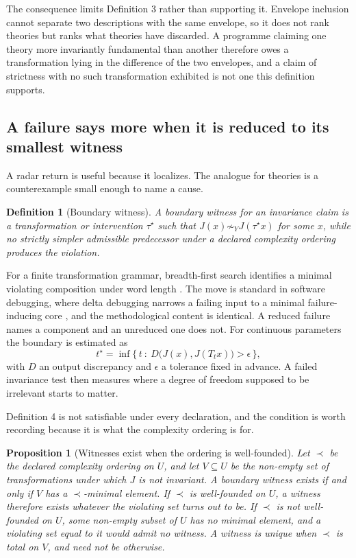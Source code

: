 \documentclass[11pt]{article}
\newtheorem{definition}{Definition}
\newtheorem{proposition}{Proposition}
\theoremstyle{remark}
\begin{document}
The consequence limits Definition 3 rather than supporting it. Envelope inclusion
cannot separate two descriptions with the same envelope, so it does not rank
theories but ranks what theories have discarded. A programme claiming one theory
more invariantly fundamental than another therefore owes a transformation lying in
the difference of the two envelopes, and a claim of strictness with no such
transformation exhibited is not one this definition supports.

\subsection{A failure says more when it is reduced to its smallest witness}

A radar return is useful because it localizes. The analogue for theories is a
counterexample small enough to name a cause.

\begin{definition}[Boundary witness]
A boundary witness for an invariance claim is a transformation or intervention
$\tau^\star$ such that $J(x) \not\sim_Y J(\tau^\star x)$ for some $x$, while no
strictly simpler admissible predecessor under a declared complexity ordering
produces the violation.
\end{definition}

For a finite transformation grammar, breadth-first search identifies a minimal
violating composition under word length \citep{bond2026pe}. The move is standard in
software debugging, where delta debugging narrows a failing input to a minimal
failure-inducing core \citep{zeller2002}, and the methodological content is
identical. A reduced failure names a component and an unreduced one does not. For
continuous parameters the boundary is estimated as
\begin{equation}
t^\star = \inf \{\, t \ : \ D\big(J(x), J(T_t x)\big) > \epsilon \,\},
\label{eq:boundary}
\end{equation}
with $D$ an output discrepancy and $\epsilon$ a tolerance fixed in advance. A
failed invariance test then measures where a degree of freedom supposed to be
irrelevant starts to matter.

Definition 4 is not satisfiable under every declaration, and the condition is worth
recording because it is what the complexity ordering is for.

\begin{proposition}[Witnesses exist when the ordering is well-founded]
Let $\prec$ be the declared complexity ordering on $U$, and let $V \subseteq U$ be
the non-empty set of transformations under which $J$ is not invariant. A boundary
witness exists if and only if $V$ has a $\prec$-minimal element. If $\prec$ is
well-founded on $U$, a witness therefore exists whatever the violating set turns
out to be. If $\prec$ is not well-founded on $U$, some non-empty subset of $U$ has
no minimal element, and a violating set equal to it would admit no witness. A
witness is unique when $\prec$ is total on $V$, and need not be otherwise.
\end{proposition}
\end{document}
